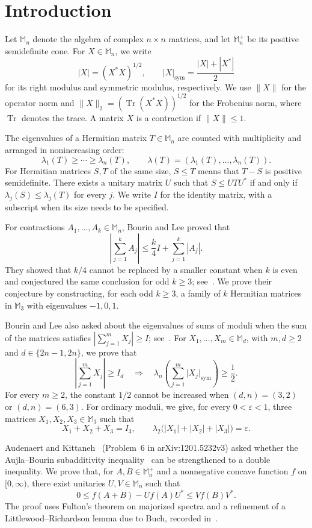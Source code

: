 \documentclass[11pt]{amsart}
\numberwithin{equation}{section}
\newcommand{\Mn}{\mathbb M_n}
\newcommand{\Mnp}{\mathbb M_n^+}
\newcommand{\Tr}{\operatorname{Tr}}
\newcommand{\norm}[1]{\lVert #1\rVert}
\newcommand{\smod}[1]{\lvert #1\rvert_{\mathrm{sym}}}
\begin{document}
\section{Introduction}

Let $\Mn$ denote the algebra of complex $n\times n$ matrices,
and let $\Mnp$ be its positive semidefinite cone. For $X\in\Mn$,
we write
\[
 |X|=(X^*X)^{1/2},
 \qquad
 \smod{X}=\frac{|X|+|X^*|}{2}
\]
for its right modulus and symmetric modulus, respectively.
We use $\norm{X}$ for the operator norm and
$\|X\|_2=(\Tr(X^*X))^{1/2}$ for the Frobenius norm, where
$\Tr$ denotes the trace. A matrix $X$ is a contraction if
$\norm{X}\leq1$.

The eigenvalues of a Hermitian matrix $T\in\Mn$ are counted
with multiplicity and arranged in nonincreasing order:
\[
 \lambda_1(T)\geq\cdots\geq\lambda_n(T),
 \qquad
 \lambda(T)=(\lambda_1(T),\ldots,\lambda_n(T)).
\]
For Hermitian matrices $S,T$ of the same size, $S\leq T$
means that $T-S$ is positive semidefinite. There exists
a unitary matrix $U$ such that $S\leq UTU^*$ if and only if
$\lambda_j(S)\leq\lambda_j(T)$ for every $j$.
We write $I$ for the identity matrix, with a subscript when
its size needs to be specified.

For contractions $A_1,\ldots,A_k\in\Mn$, Bourin and Lee
proved that
\[
 \left|\sum_{j=1}^k A_j\right|
 \leq \frac{k}{4}I+\sum_{j=1}^k|A_j|.
\]
They showed that $k/4$ cannot be replaced by a smaller constant
when $k$ is even and conjectured the same conclusion for
odd $k\geq3$; see~\cite[Corollary~4.4 and Remark~4.5]{BourinLee2024}.
We prove their conjecture by constructing, for each odd
$k\geq3$, a family of $k$ Hermitian matrices in $\mathbb M_3$
with eigenvalues $-1,0,1$.

Bourin and Lee also asked about the eigenvalues of sums of
moduli when the sum of the matrices satisfies
$\left|\sum_{j=1}^mX_j\right|\geq I$;
see~\cite[Question~6.3]{BourinLee2026}.
For $X_1,\ldots,X_m\in\mathbb M_d$, with $m,d\geq2$ and
$d\in\{2n-1,2n\}$, we prove that
\[
 \left|\sum_{j=1}^mX_j\right|\geq I_d
 \quad\Longrightarrow\quad
 \lambda_n\left(\sum_{j=1}^m\smod{X_j}\right)\geq\frac12.
\]
For every $m\geq2$, the constant $1/2$ cannot be increased
when $(d,n)=(3,2)$ or $(d,n)=(6,3)$.
For ordinary moduli, we give, for every $0<\varepsilon<1$,
three matrices $X_1,X_2,X_3\in\mathbb M_3$ such that
\[
 X_1+X_2+X_3=I_3,
 \qquad
 \lambda_2\bigl(|X_1|+|X_2|+|X_3|\bigr)=\varepsilon.
\]

Audenaert and Kittaneh~\cite[Problem~5]{AK}
(Problem~6 in arXiv:1201.5232v3) asked whether
the Aujla--Bourin subadditivity inequality~\cite{AB} can be
strengthened to a double inequality. We prove that, for
$A,B\in\Mnp$ and a nonnegative concave function $f$ on
$[0,\infty)$, there exist unitaries $U,V\in\Mn$ such that
\[
 0\leq f(A+B)-Uf(A)U^*\leq Vf(B)V^*.
\]
The proof uses Fulton's theorem on majorized spectra and
a refinement of a Littlewood--Richardson lemma due to Buch,
recorded in~\cite[Lemma~3 and footnote~2]{Fulton}.
\end{document}
